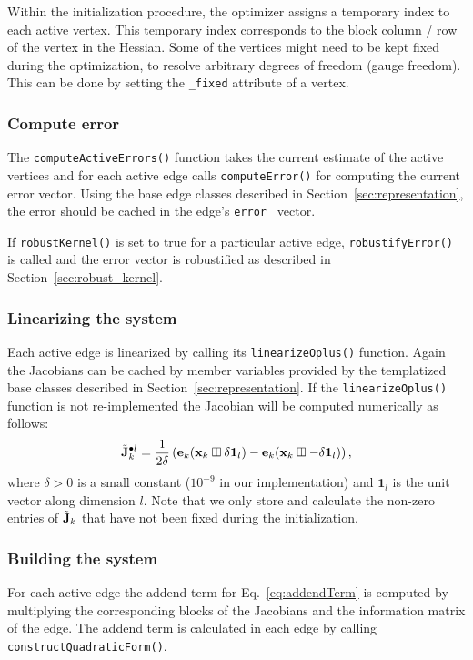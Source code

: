 \documentclass[a4paper]{article}
\begin{document}
Within the initialization procedure, the optimizer assigns a temporary
index to each active vertex. This temporary index corresponds to the
block column / row of the vertex in the Hessian. Some of the vertices
might need to be kept fixed during the optimization, to resolve
arbitrary degrees of freedom (gauge freedom). This can be done by
setting the \verb+_fixed+ attribute of a vertex.

\subsubsection{Compute error\label{sec:error}}
The \verb+computeActiveErrors()+ function takes the current estimate of
the active vertices and for each active edge calls
\verb+computeError()+ for computing the current error vector. Using
the base edge classes described in Section~\ref{sec:representation},
the error should be cached in the edge's \verb+error_+ vector.

If \verb+robustKernel()+ is set to true for a particular active edge,
\verb+robustifyError()+ is called and the error vector is robustified
as described in Section~\ref{sec:robust_kernel}.

\subsubsection{Linearizing the system}
Each active edge is linearized by calling its
\verb+linearizeOplus()+ function. Again the Jacobians can be cached by
member variables provided by the templatized base classes described in
Section~\ref{sec:representation}. If the \verb+linearizeOplus()+
function is not re-implemented the Jacobian will be computed
numerically as follows:
\begin{eqnarray}
  \tilde {\mathbf{J}}_k^{\bullet l} = \frac{1}{2\delta} \left(
  \mathbf{e}_k (\mathbf{x}_k \boxplus \delta\mathbf{1}_l)
  -
  \mathbf{e}_k (\mathbf{x}_k \boxplus -\delta\mathbf{1}_l)
  \right),
  \label{eqn:jacobiannumeric}
\end{eqnarray}
where $\delta > 0$ is a small constant ($10^{-9}$ in our
implementation) and $\mathbf{1}_l$ is the unit vector along dimension
$l$. Note that we only store and calculate the non-zero entries of
$\tilde {\mathbf{J}}_k$ that have not been fixed during the initialization.

\subsubsection{Building the system}
For each active edge the addend term for Eq.~\ref{eq:addendTerm} is
computed by multiplying the corresponding blocks of the Jacobians and
the information matrix of the edge. The addend term is calculated in
each edge by calling \verb+constructQuadraticForm()+.
\end{document}
